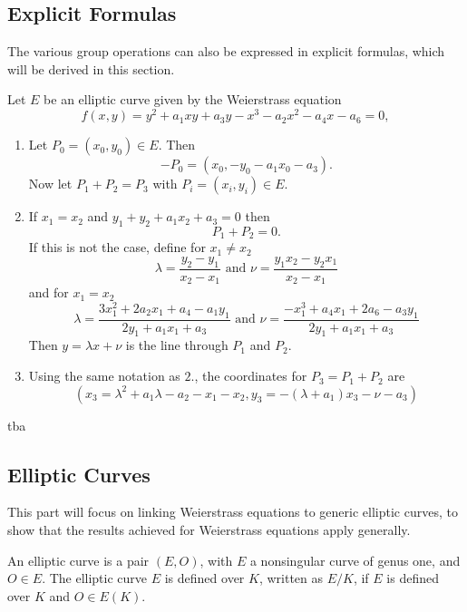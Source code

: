 \subsection{Explicit Formulas}
The various group operations can also be expressed in explicit formulas, which will be derived in this section.
\begin{thm}
	Let $E$ be an elliptic curve given by the Weierstrass equation
	\begin{equation*}
	f(x,y)=y^2+a_1xy+a_3y-x^3-a_2x^2-a_4x-a_6=0,
	\end{equation*}
	\begin{enumerate}
		\item Let $P_0=(x_0,y_0)\in E$. Then
		\begin{equation*}
		-P_0=(x_0,-y_0-a_1x_0-a_3).
		\end{equation*}
		Now let $P_1+P_2=P_3$ with $P_i=(x_i,y_i)\in E$.
		\item If $x_1=x_2$ and $y_1+y_2+a_1x_2+a_3=0$ then
		\begin{equation*}
		P_1+P_2=0.
		\end{equation*}
		If this is not the case, define for $x_1\neq x_2$
		\begin{equation*}
		\lambda=\frac{y_2-y_1}{x_2-x_1}\text{ and }\nu=\frac{y_1x_2-y_2x_1}{x_2-x_1}
		\end{equation*}
		and for $x_1=x_2$
		\begin{equation*}
		\lambda=\frac{3x_1^2+2a_2x_1+a_4-a_1y_1}{2y_1+a_1x_1+a_3}\text{ and }\nu=\frac{-x_1^3+a_4x_1+2a_6-a_3y_1}{2y_1+a_1x_1+a_3}
		\end{equation*}
		Then $y=\lambda x+\nu$ is the line through $P_1$ and $P_2$.
		\item Using the same notation as $2.$, the coordinates for $P_3=P_1+P_2$ are
		\begin{equation*}
		(x_3=\lambda^2+a_1\lambda-a_2-x_1-x_2,y_3=-(\lambda+a_1)x_3-\nu-a_3)
		\end{equation*}
	\end{enumerate}
\end{thm}

\begin{prf}
	tba
\end{prf}

\subsection{Elliptic Curves}
This part will focus on linking Weierstrass equations to generic elliptic curves, to show that the results achieved for Weierstrass equations apply generally.
\begin{defn}
	An elliptic curve is a pair $(E,O)$, with $E$ a nonsingular curve of genus one, and $O\in E$. The elliptic curve $E$ is defined over $K$, written as $E/K$, if $E$ is defined over $K$ and $O\in E(K)$.
\end{defn}

